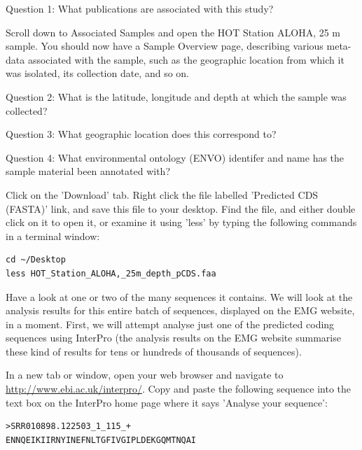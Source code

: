 \begin{questions}
Question 1: What publications are associated with this study?
\end{questions}

\begin{steps}
Scroll down to Associated Samples and open the HOT Station ALOHA, 25 m sample.
You should now have a Sample Overview page, describing various meta-data associated with the sample, such as the geographic location from which it was isolated, its collection date, and so on.
\end{steps}

\begin{questions}
Question 2: What is the latitude, longitude and depth at which the sample was collected?
\end{questions}

\begin{questions}
Question 3: What geographic location does this correspond to?
\end{questions}

\begin{questions}
Question 4: What environmental ontology (ENVO) identifer and name has the sample material been annotated with?
\end{questions}

\begin{steps}
Click on the 'Download' tab. Right click the file labelled 'Predicted CDS (FASTA)' link, and save this file to your desktop. Find the file, and either double click on it to open it, or examine it using 'less' by typing the following commands in a terminal window:
\begin{lstlisting}
cd ~/Desktop
less HOT_Station_ALOHA,_25m_depth_pCDS.faa
\end{lstlisting}
\end{steps}

Have a look at one or two of the many sequences it contains.
We will look at the analysis results for this entire batch of sequences, displayed on the EMG website, in a moment. First, we will attempt analyse just one of the predicted coding sequences using InterPro (the analysis results on the EMG website summarise these kind of results for tens or hundreds of thousands of sequences).

\begin{steps}
In a new tab or window, open your web browser and navigate to \url{http://www.ebi.ac.uk/interpro/}. Copy and paste the following sequence into the text box on the InterPro home page where it says 'Analyse your sequence':
\begin{lstlisting}
>SRR010898.122503_1_115_+
ENNQEIKIIRNYINEFNLTGFIVGIPLDEKGQMTNQAI
\end{lstlisting}
\end{steps}

